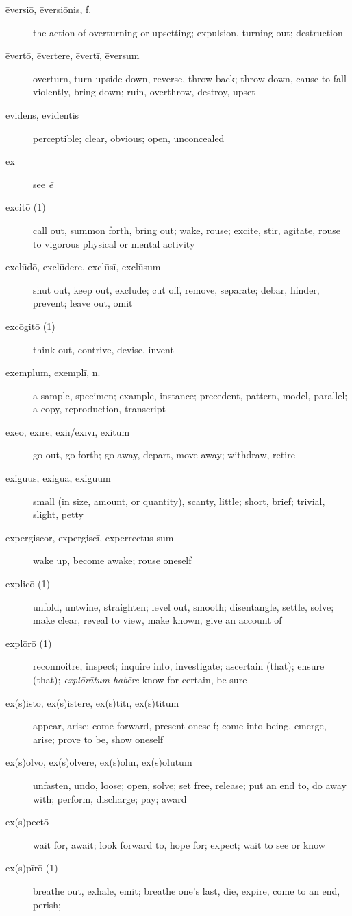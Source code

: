 \begin{description}
    \item[ēversiō, ēversiōnis, f.] the action of overturning or upsetting; expulsion, turning out; destruction
    \item[ēvertō, ēvertere, ēvertī, ēversum] overturn, turn upside down, reverse, throw back; throw down, cause to fall violently, bring down; ruin, overthrow, destroy, upset
    \item[ēvidēns, ēvidentis] perceptible; clear, obvious; open, unconcealed
    \item[ex] see \textit{ē}
    \item[excitō (1)] call out, summon forth, bring out; wake, rouse; excite, stir, agitate, rouse to vigorous physical or mental activity
    \item[exclūdō, exclūdere, exclūsī, exclūsum] shut out, keep out, exclude; cut off, remove, separate; debar, hinder, prevent; leave out, omit
    \item[excōgitō (1)] think out, contrive, devise, invent
    \item[exemplum, exemplī, n.] a sample, specimen; example, instance; precedent, pattern, model, parallel; a copy, reproduction, transcript
    \item[exeō, exīre, exiī/exīvī, exitum] go out, go forth; go away, depart, move away; withdraw, retire
    \item[exiguus, exigua, exiguum] small (in size, amount, or quantity), scanty, little; short, brief; trivial, slight, petty
    \item[expergiscor, expergiscī, experrectus sum] wake up, become awake; rouse oneself
    \item[explicō (1)] unfold, untwine, straighten; level out, smooth; disentangle, settle, solve; make clear, reveal to view, make known, give an account of
    \item[explōrō (1)] reconnoitre, inspect; inquire into, investigate; ascertain (that); ensure (that); \textit{explōrātum habēre} know for certain, be sure
    \item[ex(s)istō, ex(s)istere, ex(s)titī, ex(s)titum] appear, arise; come forward, present oneself; come into being, emerge, arise; prove to be, show oneself
    \item[ex(s)olvō, ex(s)olvere, ex(s)oluī, ex(s)olūtum] unfasten, undo, loose; open, solve; set free, release; put an end to, do away with; perform, discharge; pay; award
    \item[ex(s)pectō] wait for, await; look forward to, hope for; expect; wait to see or know
    \item[ex(s)pīrō (1)] breathe out, exhale, emit; breathe one's last, die, expire, come to an end, perish;

\end{description}
